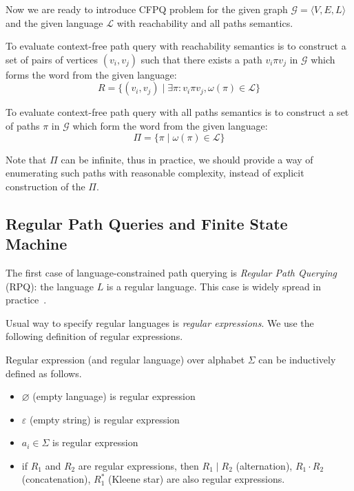 Now we are ready to introduce CFPQ problem for the given graph  $\mathcal{G} = \langle V,E,L \rangle$ and the given language $\mathcal{L}$ with reachability and all paths semantics.

\begin{definition}
To evaluate context-free path query with reachability semantics is to construct a set of pairs of vertices $(v_i,v_j)$ such that there exists a path $v_i \pi v_j$ in $\mathcal{G}$ which forms the word from the given language:
$$
R = \{(v_i,v_j) \mid \exists \pi: v_i \pi v_j, \omega(\pi) \in \mathcal{L} \}
$$
\end{definition}

\begin{definition}
To evaluate context-free path query with all paths semantics is to construct a set of paths $\pi$ in $\mathcal{G}$ which form the word from the given language:
$$
\Pi = \{ \pi \mid \omega(\pi) \in \mathcal{L}\}
$$
\end{definition}

Note that $\Pi$ can be infinite, thus in practice, we should provide a way of enumerating such paths with reasonable complexity, instead of explicit construction of the $\Pi$.

\subsection{Regular Path Queries and Finite State Machine}

The first case of language-constrained path querying is \textit{Regular Path Querying} (RPQ): the language $L$ is a regular language. This case is widely spread in practice~\cite{!!!}. 

Usual way to specify regular languages is \textit{regular expressions}. 
We use the following definition of regular expressions.
\begin{definition}
Regular expression (and regular language) over alphabet $\Sigma$ can be inductively defined as follows.
\begin{itemize}
    \item $\varnothing$ (empty language) is regular expression
    \item $\varepsilon$ (empty string) is regular expression
    \item $a_i \in \Sigma$ is regular expression
    \item if $R_1$ and $R_2$ are regular expressions, then $R_1 \mid R_2$ (alternation), $R_1 \cdot R_2$ (concatenation), $R_1^*$ (Kleene star) are also regular expressions. 
\end{itemize}
\end{definition} 

